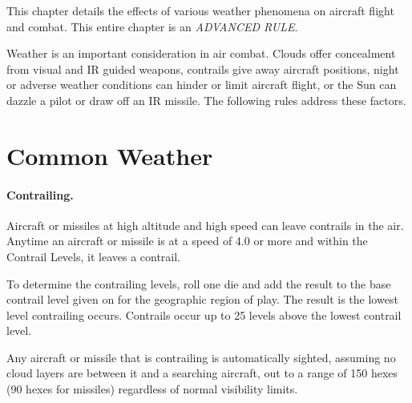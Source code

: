 

\label{rule:night-and-weather}

This chapter details the effects of various weather phenomena on aircraft flight and combat. This entire chapter is an \emph{ADVANCED RULE}.

\begin{advancedrules}

    Weather is an important consideration in air combat. Clouds offer concealment from visual and IR guided weapons, contrails give away aircraft positions, night or adverse weather conditions can hinder or limit aircraft flight, or the Sun can dazzle a pilot or draw off an IR missile. The following rules address these factors.
    
    
\section{Common Weather}

\label{rule:clouds}
\label{rule:haze}
\label{rule:stratus-clouds}
\label{rule:dense-clouds}



\paragraph{Contrailing.} Aircraft or missiles at high altitude and high speed can leave contrails in the air. Anytime an aircraft or missile is at a speed of 4.0 or more and within the Contrail Levels, it leaves a contrail.

To determine the contrailing levels, roll one die and add the result to the base contrail level given on  for the geographic region of play. The result is the lowest level contrailing occurs. Contrails occur up to 25 levels above the lowest contrail level.

Any aircraft or missile that is contrailing is automatically sighted, assuming no cloud layers are between it and a searching aircraft, out to a range of 150 hexes (90 hexes for missiles) regardless of normal visibility limits.

\end{advancedrules}
